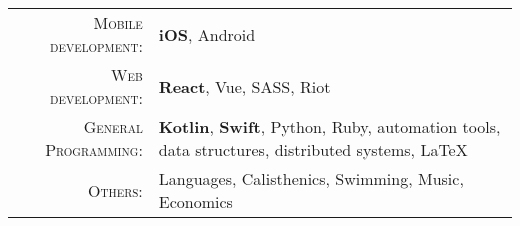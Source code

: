 %
%
%

\begin{tabular}{rl}
    \textsc{Mobile development:} & \textbf{iOS}, Android \\
    \textsc{Web development:} & \textbf{React}, Vue, SASS, Riot \\ 
    \textsc{General Programming:} & \textbf{Kotlin}, \textbf{Swift}, Python, Ruby, automation tools, data structures, distributed systems, LaTeX \\ 
    \textsc{Others:} & Languages, Calisthenics, Swimming, Music, Economics \\
\end{tabular}